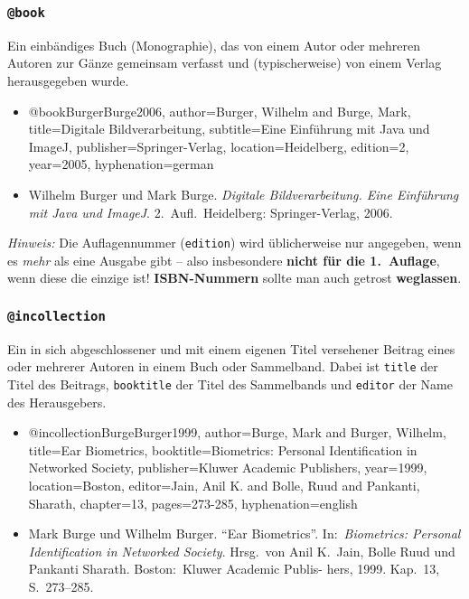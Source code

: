 \subsubsection{\texttt{@book}}
\label{sec:@book}
Ein einbändiges Buch (Monographie), das von einem Autor oder mehreren Autoren zur Gänze gemeinsam verfasst und (typischerweise) von einem Verlag herausgegeben wurde.
% 
\begin{itemize}
\item[] 
\begin{GenericCode}[numbers=none]
@book{BurgerBurge2006,
    author={Burger, Wilhelm and Burge, Mark},
    title={Digitale Bildverarbeitung},
	  subtitle={Eine Einführung mit Java und ImageJ},
    publisher={Springer-Verlag},
    location={Heidelberg},
    edition={2},
    year={2005},
    hyphenation={german}
}
\end{GenericCode}
\item[\cite{BurgerBurge2006}]
Wilhelm Burger und Mark Burge. \textit{Digitale Bildverarbeitung. Eine
Einführung mit Java und ImageJ}. 2.\ Aufl.\ Heidelberg: Springer-Verlag,
2006.
\end{itemize}
%
\emph{Hinweis:} Die Auflagennummer (\texttt{edition}) wird üblicherweise nur angegeben, 
wenn es \emph{mehr} als eine Ausgabe gibt -- also insbesondere \textbf{nicht für die 1.\ Auflage}, 
wenn diese die einzige ist!
\textbf{ISBN-Nummern} sollte man auch getrost \textbf{weglassen}.


\subsubsection{\texttt{@incollection}}
\label{sec:@incollection}
Ein in sich abgeschlossener und mit einem eigenen Titel versehener
Beitrag eines oder mehrerer Autoren in einem Buch oder Sammelband.
Dabei ist \texttt{title} der Titel des Beitrags, \texttt{booktitle} der Titel des Sammelbands und
\texttt{editor} der Name des Herausgebers.
%
\begin{itemize}
\item[] 
\begin{GenericCode}[numbers=none]
@incollection{BurgeBurger1999,
  author={Burge, Mark and Burger, Wilhelm},
  title={Ear Biometrics},
  booktitle={Biometrics: Personal Identification in Networked Society},
  publisher={Kluwer Academic Publishers},
  year={1999},
  location={Boston},
  editor={Jain, Anil K. and Bolle, Ruud and Pankanti, Sharath},
  chapter={13},
  pages={273-285},
  hyphenation={english}
}
\end{GenericCode}
\item[\cite{BurgeBurger1999}]
Mark Burge und Wilhelm Burger. "`Ear Biometrics"'. In:\ \textit{Biometrics:
Personal Identification in Networked Society}. Hrsg.\ von Anil K.\ Jain,
Bolle Ruud und Pankanti Sharath. Boston:\ Kluwer Academic Publis-
hers, 1999. Kap.\ 13, S.\ 273--285.
\end{itemize}

